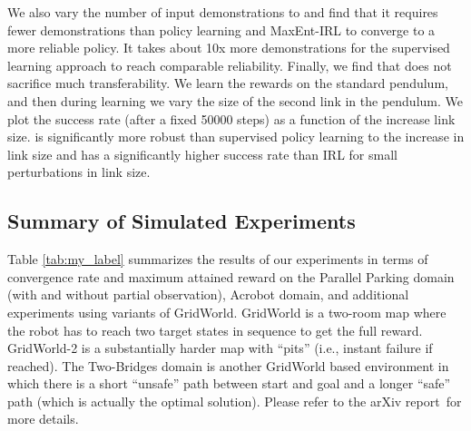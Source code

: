 
We also vary the number of input demonstrations to \hirl and find that it requires fewer demonstrations than policy learning and MaxEnt-IRL to converge to a more reliable policy.
It takes about 10x more demonstrations for the supervised learning approach to reach comparable reliability.
Finally, we find that \hirl does not sacrifice much transferability.
We learn the rewards on the standard pendulum, and then during learning we vary the size of the second link in the pendulum.
We plot the success rate (after a fixed 50000 steps) as a function of the increase link size.
\hirl is significantly more robust than supervised policy learning to the increase in link size and has a significantly higher success rate than IRL for small perturbations in link size. 

\subsection{Summary of Simulated Experiments}
Table \ref{tab:my_label} summarizes the results of our experiments in terms of convergence rate and maximum attained reward on the Parallel Parking domain (with and without partial observation), Acrobot domain, and additional experiments using variants of GridWorld.
GridWorld is a two-room map where the robot has to reach two target states in sequence to get the full reward.
GridWorld-2 is a substantially harder map with ``pits'' (i.e., instant failure if reached).
The Two-Bridges domain is another GridWorld based environment in which there is a short ``unsafe'' path between start and goal and a longer ``safe'' path (which is actually the optimal solution). Please refer to the arXiv report\,\cite{krishnan2016hirl} for more details.

